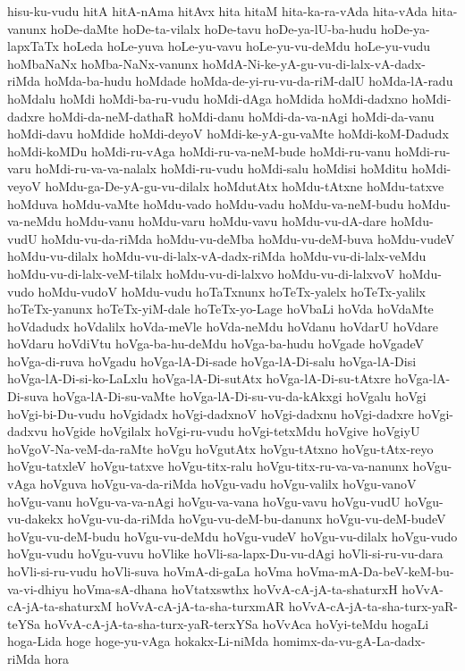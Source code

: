 {hisu-ku-vudu
hitA
hitA-nAma
hitAvx
hita
hitaM
hita-ka-ra-vAda
hita-vAda
hita-vanunx
hoDe-daMte
hoDe-ta-vilalx
hoDe-tavu
hoDe-ya-lU-ba-hudu
hoDe-ya-lapxTaTx
hoLeda
hoLe-yuva
hoLe-yu-vavu
hoLe-yu-vu-deMdu
hoLe-yu-vudu
hoMbaNaNx
hoMba-NaNx-vanunx
hoMdA-Ni-ke-yA-gu-vu-di-lalx-vA-dadx-riMda
hoMda-ba-hudu
hoMdade
hoMda-de-yi-ru-vu-da-riM-dalU
hoMda-lA-radu
hoMdalu
hoMdi
hoMdi-ba-ru-vudu
hoMdi-dAga
hoMdida
hoMdi-dadxno
hoMdi-dadxre
hoMdi-da-neM-dathaR
hoMdi-danu
hoMdi-da-va-nAgi
hoMdi-da-vanu
hoMdi-davu
hoMdide
hoMdi-deyoV
hoMdi-ke-yA-gu-vaMte
hoMdi-koM-Dadudx
hoMdi-koMDu
hoMdi-ru-vAga
hoMdi-ru-va-neM-bude
hoMdi-ru-vanu
hoMdi-ru-varu
hoMdi-ru-va-va-nalalx
hoMdi-ru-vudu
hoMdi-salu
hoMdisi
hoMditu
hoMdi-veyoV
hoMdu-ga-De-yA-gu-vu-dilalx
hoMdutAtx
hoMdu-tAtxne
hoMdu-tatxve
hoMduva
hoMdu-vaMte
hoMdu-vado
hoMdu-vadu
hoMdu-va-neM-budu
hoMdu-va-neMdu
hoMdu-vanu
hoMdu-varu
hoMdu-vavu
hoMdu-vu-dA-dare
hoMdu-vudU
hoMdu-vu-da-riMda
hoMdu-vu-deMba
hoMdu-vu-deM-buva
hoMdu-vudeV
hoMdu-vu-dilalx
hoMdu-vu-di-lalx-vA-dadx-riMda
hoMdu-vu-di-lalx-veMdu
hoMdu-vu-di-lalx-veM-tilalx
hoMdu-vu-di-lalxvo
hoMdu-vu-di-lalxvoV
hoMdu-vudo
hoMdu-vudoV
hoMdu-vudu
hoTaTxnunx
hoTeTx-yalelx
hoTeTx-yalilx
hoTeTx-yanunx
hoTeTx-yiM-dale
hoTeTx-yo-Lage
hoVbaLi
hoVda
hoVdaMte
hoVdadudx
hoVdalilx
hoVda-meVle
hoVda-neMdu
hoVdanu
hoVdarU
hoVdare
hoVdaru
hoVdiVtu
hoVga-ba-hu-deMdu
hoVga-ba-hudu
hoVgade
hoVgadeV
hoVga-di-ruva
hoVgadu
hoVga-lA-Di-sade
hoVga-lA-Di-salu
hoVga-lA-Disi
hoVga-lA-Di-si-ko-LaLxlu
hoVga-lA-Di-sutAtx
hoVga-lA-Di-su-tAtxre
hoVga-lA-Di-suva
hoVga-lA-Di-su-vaMte
hoVga-lA-Di-su-vu-da-kAkxgi
hoVgalu
hoVgi
hoVgi-bi-Du-vudu
hoVgidadx
hoVgi-dadxnoV
hoVgi-dadxnu
hoVgi-dadxre
hoVgi-dadxvu
hoVgide
hoVgilalx
hoVgi-ru-vudu
hoVgi-tetxMdu
hoVgive
hoVgiyU
hoVgoV-Na-veM-da-raMte
hoVgu
hoVgutAtx
hoVgu-tAtxno
hoVgu-tAtx-reyo
hoVgu-tatxleV
hoVgu-tatxve
hoVgu-titx-ralu
hoVgu-titx-ru-va-va-nanunx
hoVgu-vAga
hoVguva
hoVgu-va-da-riMda
hoVgu-vadu
hoVgu-valilx
hoVgu-vanoV
hoVgu-vanu
hoVgu-va-va-nAgi
hoVgu-va-vana
hoVgu-vavu
hoVgu-vudU
hoVgu-vu-dakekx
hoVgu-vu-da-riMda
hoVgu-vu-deM-bu-danunx
hoVgu-vu-deM-budeV
hoVgu-vu-deM-budu
hoVgu-vu-deMdu
hoVgu-vudeV
hoVgu-vu-dilalx
hoVgu-vudo
hoVgu-vudu
hoVgu-vuvu
hoVlike
hoVli-sa-lapx-Du-vu-dAgi
hoVli-si-ru-vu-dara
hoVli-si-ru-vudu
hoVli-suva
hoVmA-di-gaLa
hoVma
hoVma-mA-Da-beV-keM-bu-va-vi-dhiyu
hoVma-sA-dhana
hoVtatxswthx
hoVvA-cA-jA-ta-shaturxH
hoVvA-cA-jA-ta-shaturxM
hoVvA-cA-jA-ta-sha-turxmAR
hoVvA-cA-jA-ta-sha-turx-yaR-teYSa
hoVvA-cA-jA-ta-sha-turx-yaR-terxYSa
hoVvAca
hoVyi-teMdu
hogaLi
hoga-Lida
hoge
hoge-yu-vAga
hokakx-Li-niMda
homimx-da-vu-gA-La-dadx-riMda
hora
}
